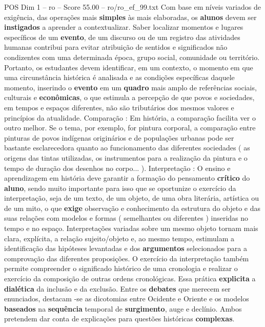 \begin{textsample}{POS Dim 1 – ro – Score 55.00 – ro/ro\_ef\_99.txt}
Com base em níveis variados de exigência, das operações mais \textbf{simples} às mais elaboradas, os \textbf{alunos} devem ser \textbf{instigados} a aprender a contextualizar.
Saber localizar momentos e lugares específicos de um \textbf{evento}, de um discurso ou de um registro das atividades humanas contribui para evitar atribuição de sentidos e significados não condizentes com uma determinada época, grupo social, comunidade ou território.
Portanto, os estudantes devem identificar, em um contexto, o momento em que uma circunstância histórica é analisada e as condições específicas daquele momento, inserindo o \textbf{evento} em um \textbf{quadro} mais amplo de referências sociais, culturais e \textbf{econômicas}, o que estimula a percepção de que povos e sociedades, em tempos e espaços diferentes, não são tributários dos mesmos valores e princípios da atualidade.
Comparação : Em história, a comparação facilita ver o outro melhor.
Se o tema, por exemplo, for pintura corporal, a comparação entre pinturas de povos indígenas originários e de populações urbanas pode ser bastante esclarecedora quanto ao funcionamento das diferentes sociedades ( as origens das tintas utilizadas, os instrumentos para a realização da pintura e o tempo de duração dos desenhos no corpo... ).
Interpretação : O ensino e aprendizagem em história deve garantir a formação do pensamento \textbf{crítico} do \textbf{aluno}, sendo muito importante para isso que se oportunize o exercício da interpretação, seja de um texto, de um objeto, de uma obra literária, artística ou de um mito, o que \textbf{exige} observação e conhecimento da estrutura do objeto e das suas relações com modelos e formas ( semelhantes ou diferentes ) inseridas no tempo e no espaço.
Interpretações variadas sobre um mesmo objeto tornam mais clara, explícita, a relação sujeito/objeto e, ao mesmo tempo, estimulam a identificação das hipóteses levantadas e dos \textbf{argumentos} selecionados para a comprovação das diferentes proposições.
O exercício da interpretação também permite compreender o significado histórico de uma cronologia e realizar o exercício da composição de outras ordens cronológicas.
Essa prática \textbf{explicita} a \textbf{dialética} da inclusão e da exclusão.
Entre os \textbf{debates} que merecem ser enunciados, destacam -se as dicotomias entre Ocidente e Oriente e os modelos \textbf{baseados} na \textbf{sequência} temporal de \textbf{surgimento}, auge e declínio.
Ambos pretendem dar conta de explicações para questões históricas \textbf{complexas}.

\end{textsample}
